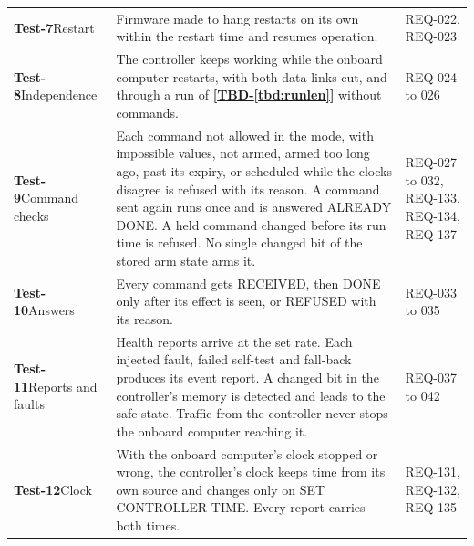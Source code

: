\documentclass[11pt,a4paper]{article}
\newcommand{\tbd}[1]{\mbox{\textbf{[\hyperref[tbd:#1]{TBD-\ref*{tbd:#1}}]}}}
\begin{document}
{\begin{xltabular}{\textwidth}{@{}>{\raggedright\arraybackslash}p{3.0cm}>{\raggedright\arraybackslash}X>{\raggedright\arraybackslash}p{2.4cm}@{}}
\textbf{Test-7}\newline Restart & Firmware made to hang restarts on its own within the restart time and resumes operation. & REQ-022, REQ-023 \\
\textbf{Test-8}\newline Independence & The controller keeps working while the onboard computer restarts, with both data links cut, and through a run of \tbd{runlen} without commands. & REQ-024 to 026 \\
\textbf{Test-9}\newline Command checks & Each command not allowed in the mode, with impossible values, not armed, armed too long ago, past its expiry, or scheduled while the clocks disagree is refused with its reason. A command sent again runs once and is answered ALREADY DONE. A held command changed before its run time is refused. No single changed bit of the stored arm state arms it. & REQ-027 to 032, REQ-133, REQ-134, REQ-137 \\
\textbf{Test-10}\newline Answers & Every command gets RECEIVED, then DONE only after its effect is seen, or REFUSED with its reason. & REQ-033 to 035 \\
\textbf{Test-11}\newline Reports and faults & Health reports arrive at the set rate. Each injected fault, failed self-test and fall-back produces its event report. A changed bit in the controller's memory is detected and leads to the safe state. Traffic from the controller never stops the onboard computer reaching it. & REQ-037 to 042 \\
\textbf{Test-12}\newline Clock & With the onboard computer's clock stopped or wrong, the controller's clock keeps time from its own source and changes only on SET CONTROLLER TIME. Every report carries both times. & REQ-131, REQ-132, REQ-135 \\
\bottomrule
\end{xltabular}}
\addtocounter{table}{-1}
\end{document}
